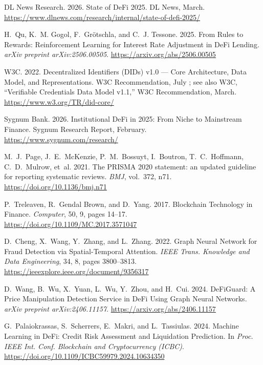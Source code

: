 \documentclass[12pt,a4paper]{report}
\begin{document}
{\begin{enumerate}[label={[\arabic*]}]
\item DL News Research. 2026. State of DeFi 2025. DL News, March. \url{https://www.dlnews.com/research/internal/state-of-defi-2025/}

\item H.~Qu, K.~M. Gogol, F.~Gr\"{o}tschla, and C.~J. Tessone. 2025. From Rules to Rewards: Reinforcement Learning for Interest Rate Adjustment in DeFi Lending. \emph{arXiv preprint arXiv:2506.00505}. \url{https://arxiv.org/abs/2506.00505}

\item W3C. 2022. Decentralized Identifiers (DIDs) v1.0 --- Core Architecture, Data Model, and Representations. W3C Recommendation, July ; see also W3C, ``Verifiable Credentials Data Model v1.1,'' W3C Recommendation, March. \url{https://www.w3.org/TR/did-core/}

\item Sygnum Bank. 2026. Institutional DeFi in 2025: From Niche to Mainstream Finance. Sygnum Research Report, February. \url{https://www.sygnum.com/research/}

\item M.~J.~Page, J.~E.~McKenzie, P.~M.~Bossuyt, I.~Boutron, T.~C.~Hoffmann, C.~D.~Mulrow, et~al. 2021. The PRISMA 2020 statement: an updated guideline for reporting systematic reviews. \emph{BMJ}, vol.~372, n71. \url{https://doi.org/10.1136/bmj.n71}

\item P.~Treleaven, R.~Gendal Brown, and D.~Yang. 2017. Blockchain Technology in Finance. \emph{Computer}, 50, 9, pages 14--17. \url{https://doi.org/10.1109/MC.2017.3571047}

\item D.~Cheng, X.~Wang, Y.~Zhang, and L.~Zhang. 2022. Graph Neural Network for Fraud Detection via Spatial-Temporal Attention. \emph{IEEE Trans. Knowledge and Data Engineering}, 34, 8, pages 3800--3813. \url{https://ieeexplore.ieee.org/document/9356317}

\item D.~Wang, B.~Wu, X.~Yuan, L.~Wu, Y.~Zhou, and H.~Cui. 2024. DeFiGuard: A Price Manipulation Detection Service in DeFi Using Graph Neural Networks. \emph{arXiv preprint arXiv:2406.11157}. \url{https://arxiv.org/abs/2406.11157}

\item G.~Palaiokrassas, S.~Scherrers, E.~Makri, and L.~Tassiulas. 2024. Machine Learning in DeFi: Credit Risk Assessment and Liquidation Prediction. In \emph{Proc. IEEE Int. Conf. Blockchain and Cryptocurrency (ICBC)}. \url{https://doi.org/10.1109/ICBC59979.2024.10634350}


\end{enumerate}}
\end{document}
